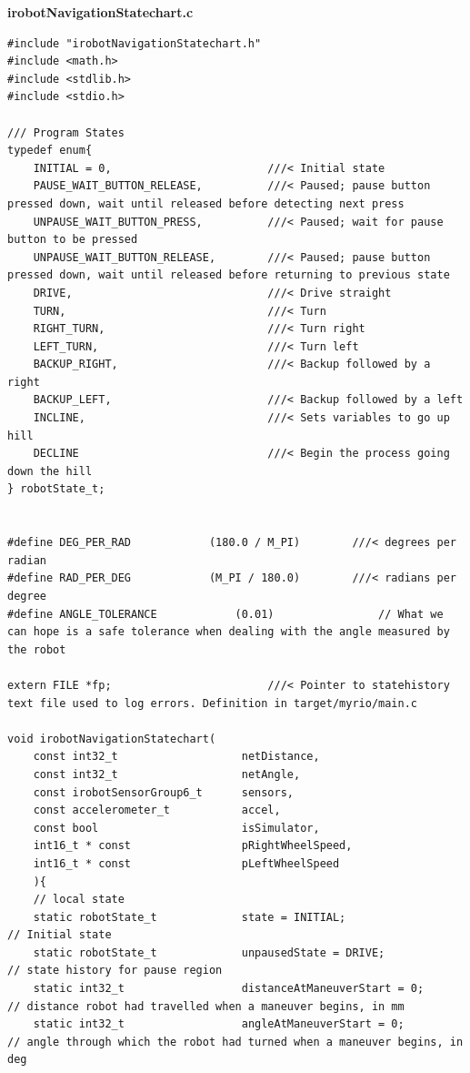 \documentclass[twoside]{article}
\begin{document}
\newpage
\noindent \textbf{irobotNavigationStatechart.c}
\vspace{-3mm}
\begin{lstlisting}[mathescape, frame=single]
#include "irobotNavigationStatechart.h"
#include <math.h>
#include <stdlib.h>
#include <stdio.h>

/// Program States
typedef enum{
    INITIAL = 0,                        ///< Initial state
    PAUSE_WAIT_BUTTON_RELEASE,          ///< Paused; pause button pressed down, wait until released before detecting next press
    UNPAUSE_WAIT_BUTTON_PRESS,          ///< Paused; wait for pause button to be pressed
    UNPAUSE_WAIT_BUTTON_RELEASE,        ///< Paused; pause button pressed down, wait until released before returning to previous state
    DRIVE,                              ///< Drive straight
    TURN,                               ///< Turn
    RIGHT_TURN,                         ///< Turn right
    LEFT_TURN,                          ///< Turn left
    BACKUP_RIGHT,						///< Backup followed by a right
    BACKUP_LEFT,						///< Backup followed by a left	
    INCLINE,							///< Sets variables to go up hill	
    DECLINE								///< Begin the process going down the hill
} robotState_t;


#define DEG_PER_RAD            (180.0 / M_PI)        ///< degrees per radian
#define RAD_PER_DEG            (M_PI / 180.0)        ///< radians per degree
#define ANGLE_TOLERANCE            (0.01)                // What we can hope is a safe tolerance when dealing with the angle measured by the robot

extern FILE *fp;						///< Pointer to statehistory text file used to log errors. Definition in target/myrio/main.c

void irobotNavigationStatechart(
    const int32_t                 	netDistance,
    const int32_t                 	netAngle,
    const irobotSensorGroup6_t    	sensors,
    const accelerometer_t         	accel,
    const bool                    	isSimulator,
    int16_t * const             	pRightWheelSpeed,
    int16_t * const             	pLeftWheelSpeed
    ){
    // local state
    static robotState_t         	state = INITIAL;                	// Initial state
    static robotState_t            	unpausedState = DRIVE;            	// state history for pause region
    static int32_t                	distanceAtManeuverStart = 0;    	// distance robot had travelled when a maneuver begins, in mm
    static int32_t                	angleAtManeuverStart = 0;        	// angle through which the robot had turned when a maneuver begins, in deg


\end{lstlisting}
\end{document}
